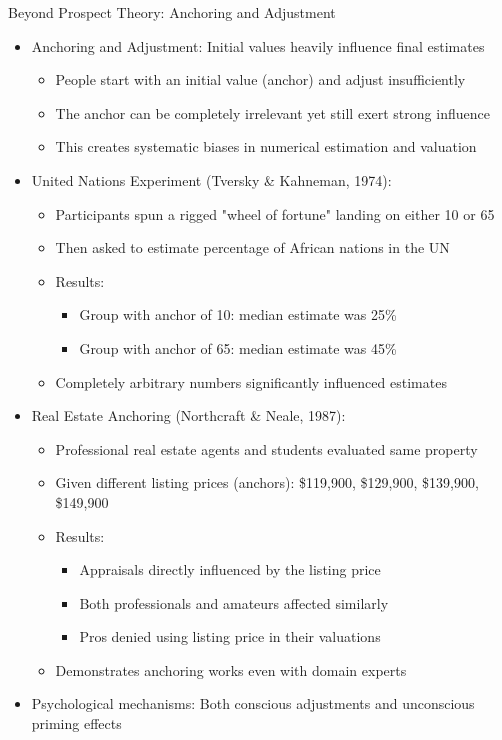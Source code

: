 \documentclass[10pt,handout]{beamer}
\begin{document}
\begin{frame}{Beyond Prospect Theory: Anchoring and Adjustment}
  \begin{itemize}[<+->]
    \item Anchoring and Adjustment: Initial values heavily influence final estimates
      \begin{itemize}
        \item People start with an initial value (anchor) and adjust insufficiently
        \item The anchor can be completely irrelevant yet still exert strong influence
        \item This creates systematic biases in numerical estimation and valuation
      \end{itemize}
    \item United Nations Experiment (Tversky \& Kahneman, 1974):
      \begin{itemize}
        \item Participants spun a rigged "wheel of fortune" landing on either 10 or 65
        \item Then asked to estimate percentage of African nations in the UN
        \item Results:
          \begin{itemize}
            \item Group with anchor of 10: median estimate was 25\%
            \item Group with anchor of 65: median estimate was 45\%
          \end{itemize}
        \item Completely arbitrary numbers significantly influenced estimates
      \end{itemize}
    \item Real Estate Anchoring (Northcraft \& Neale, 1987):
      \begin{itemize}
        \item Professional real estate agents and students evaluated same property
        \item Given different listing prices (anchors): \$119,900, \$129,900, \$139,900, \$149,900
        \item Results:
          \begin{itemize}
            \item Appraisals directly influenced by the listing price
            \item Both professionals and amateurs affected similarly
            \item Pros denied using listing price in their valuations
          \end{itemize}
        \item Demonstrates anchoring works even with domain experts
      \end{itemize}
    \item Psychological mechanisms: Both conscious adjustments and unconscious priming effects
  \end{itemize}
\end{frame}
\end{document}
